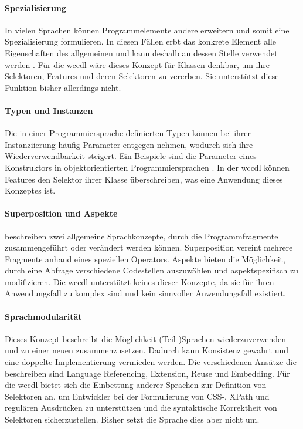     \paragraph{Spezialisierung}
    In vielen Sprachen können Programmelemente andere erweitern und somit eine Spezialisierung formulieren.
    In diesen Fällen erbt das konkrete Element alle Eigenschaften des allgemeinen
    und kann deshalb an dessen Stelle verwendet werden
    \cite[Kapitel 5.1.4]{voelter:DslEngineering}.
    Für die \gls{wccdl} wäre dieses Konzept für Klassen denkbar,
    um ihre Selektoren, Features und deren Selektoren zu vererben.
    Sie unterstützt diese Funktion bisher allerdings nicht.

    \paragraph{Typen und Instanzen}
    Die in einer Programmiersprache definierten Typen können bei ihrer Instanziierung
    häufig Parameter entgegen nehmen, wodurch sich ihre Wiederverwendbarkeit steigert.
    Ein Beispiele sind die Parameter eines Konstruktors in objektorientierten Programmiersprachen
    \cite[Kapitel 5.1.5]{voelter:DslEngineering}.
    In der \gls{wccdl} können Features den Selektor ihrer Klasse überschreiben,
    was eine Anwendung dieses Konzeptes ist.

    \paragraph{Superposition und Aspekte}
    \citet[Kapitel 5.1.6]{voelter:DslEngineering} beschreiben zwei
    allgemeine Sprachkonzepte, durch die Programmfragmente zusammengeführt
    oder verändert werden können.
    Superposition vereint mehrere Fragmente anhand eines speziellen Operators.
    Aspekte bieten die Möglichkeit, durch eine Abfrage verschiedene Codestellen
    auszuwählen und aspektspezifisch zu modifizieren.
    Die \gls{wccdl} unterstützt keines dieser Konzepte,
    da sie für ihren Anwendungsfall zu komplex sind und kein sinnvoller Anwendungsfall existiert.

    \paragraph{Sprachmodularität}
    Dieses Konzept beschreibt die Möglichkeit (Teil-)Sprachen wiederzuverwenden
    und zu einer neuen zusammenzusetzen.
    Dadurch kann Konsistenz gewahrt und eine doppelte Implementierung vermieden werden.
    Die verschiedenen Ansätze die \citet[Kapitel 4.6]{voelter:DslEngineering} beschreiben
    sind Language Referencing, Extension, Reuse und Embedding.
    Für die \gls{wccdl} bietet sich die Einbettung anderer Sprachen zur Definition von Selektoren an,
    um Entwickler bei der Formulierung von CSS-, XPath und regulären Ausdrücken zu unterstützen
    und die syntaktische Korrektheit von Selektoren sicherzustellen.
    Bisher setzt die Sprache dies aber nicht um.
